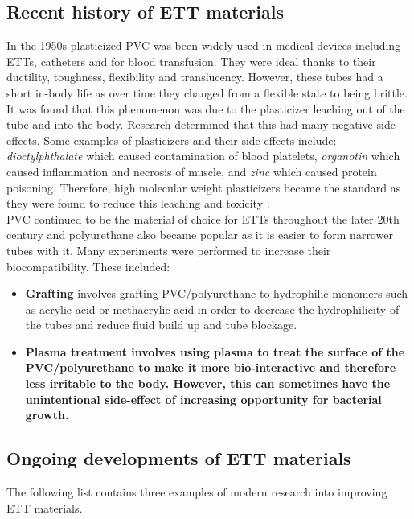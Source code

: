 \documentclass[12pt, openany, oneside]{book}
\begin{document}
\subsection{Recent history of ETT materials}
In the 1950s plasticized PVC was been widely used in medical devices including ETTs, catheters and for blood transfusion. They were ideal thanks to their ductility, toughness, flexibility and translucency. However, these tubes had a short in-body life as over time they changed from a flexible state to being brittle. It was found that this phenomenon was due to the plasticizer leaching out of the tube and into the body. Research determined that this had many negative side effects. Some examples of plasticizers and their side effects include: \textit{dioctylphthalate} which caused contamination of blood platelets, \textit{organotin} which caused inflammation and necrosis of muscle, and \textit{zinc} which caused protein poisoning. Therefore, high molecular weight plasticizers became the standard as they were found to reduce this leaching and toxicity \citep{singh1992}. \\

PVC continued to be the material of choice for ETTs throughout the later 20th century and polyurethane also became popular as it is easier to form narrower tubes with it. Many experiments were performed to increase their biocompatibility. These included:

\begin{itemize}
\item{{\bf{Grafting}} involves grafting PVC/polyurethane to hydrophilic monomers such as acrylic acid or methacrylic acid in order to decrease the hydrophilicity of the tubes and reduce fluid build up and tube blockage.}
\item{{\bf{Plasma treatment} involves using plasma to treat the surface of the PVC/polyurethane to make it more bio-interactive and therefore less irritable to the body. However, this can sometimes have the unintentional side-effect of increasing opportunity for bacterial growth.\citep{singh1992}}}
\end{itemize}



\subsection{Ongoing developments of ETT materials}
The following list contains three examples of modern research into improving ETT materials.
\end{document}
